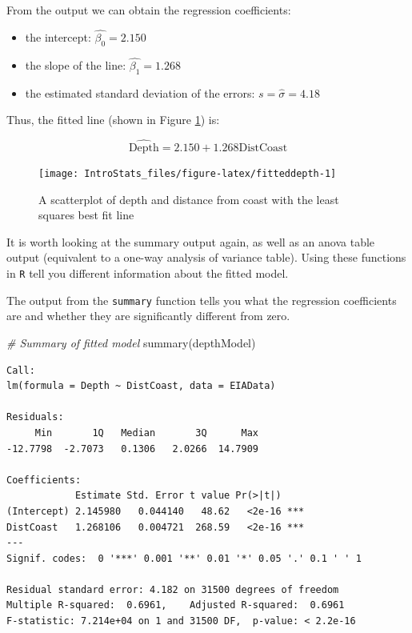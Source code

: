 \documentclass[
  oneside]{krantz}
\newenvironment{Shaded}{\begin{snugshade}}{\end{snugshade}}
\newcommand{\CommentTok}[1]{\textcolor[rgb]{0.56,0.35,0.01}{\textit{#1}}}
\newcommand{\FunctionTok}[1]{\textcolor[rgb]{0.00,0.00,0.00}{#1}}
\newcommand{\NormalTok}[1]{#1}
\providecommand{\tightlist}{%
  \setlength{\itemsep}{0pt}\setlength{\parskip}{0pt}}
\begin{document}
From the output we can obtain the regression coefficients:

\begin{itemize}
\tightlist
\item
  the intercept: \(\hat{\beta_0}=2.150\)
\item
  the slope of the line: \(\hat{\beta_1}= 1.268\)
\item
  the estimated standard deviation of the errors: \(s = \hat{\sigma}=4.18\)
\end{itemize}

Thus, the fitted line (shown in Figure \ref{fig:fitteddepth}) is:

\[\hat{\textrm{Depth}} = 2.150 + 1.268\textrm{DistCoast}\]

\begin{figure}

{\centering \texttt{[image: IntroStats\_files/figure-latex/fitteddepth-1]} 

}

\caption{A scatterplot of depth and distance from coast with the least squares best fit line}\label{fig:fitteddepth}
\end{figure}

It is worth looking at the summary output again, as well as an anova table output (equivalent to a one-way analysis of variance table). Using these functions in \texttt{R} tell you different information about the fitted model.

The output from the \texttt{summary} function tells you what the regression coefficients are and whether they are significantly different from zero.

\begin{Shaded}
\begin{Highlighting}[]
\CommentTok{\# Summary of fitted model}
\FunctionTok{summary}\NormalTok{(depthModel)}
\end{Highlighting}
\end{Shaded}

\begin{verbatim}
Call:
lm(formula = Depth ~ DistCoast, data = EIAData)

Residuals:
     Min       1Q   Median       3Q      Max 
-12.7798  -2.7073   0.1306   2.0266  14.7909 

Coefficients:
            Estimate Std. Error t value Pr(>|t|)    
(Intercept) 2.145980   0.044140   48.62   <2e-16 ***
DistCoast   1.268106   0.004721  268.59   <2e-16 ***
---
Signif. codes:  0 '***' 0.001 '**' 0.01 '*' 0.05 '.' 0.1 ' ' 1

Residual standard error: 4.182 on 31500 degrees of freedom
Multiple R-squared:  0.6961,    Adjusted R-squared:  0.6961 
F-statistic: 7.214e+04 on 1 and 31500 DF,  p-value: < 2.2e-16
\end{verbatim}
\end{document}
